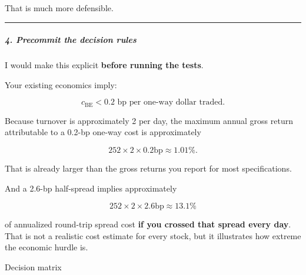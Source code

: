 That is much more defensible.

\begin{center}\rule{0.5\linewidth}{0.5pt}\end{center}

\hypertarget{precommit-the-decision-rules}{%
\subparagraph{4. Precommit the decision rules}\label{precommit-the-decision-rules}}

I would make this explicit \textbf{before running the tests}.

Your existing economics imply:

\[
c_{\mathrm{BE}}<0.2\text{ bp per one-way dollar traded}.
\]

Because turnover is approximately 2 per day, the maximum annual gross return attributable to a 0.2-bp one-way cost is approximately

\[
252\times 2\times0.2{\mathrm{bp}}
\approx1.01\%.
\]

That is already larger than the gross returns you report for most specifications.

And a 2.6-bp half-spread implies approximately

\[
252\times2\times2.6{\mathrm{bp}}
\approx13.1\%
\]

of annualized round-trip spread cost \textbf{if you crossed that spread every day}. That is not a realistic cost estimate for every stock, but it illustrates how extreme the economic hurdle is.

Decision matrix

